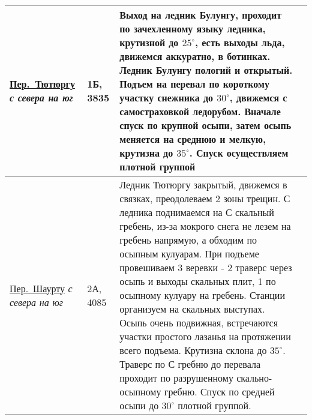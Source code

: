 \begin{longtable}{|>{\centering\arraybackslash}m{4.5cm}|>{\centering\arraybackslash}m{1.8cm}|>{\raggedright\arraybackslash}m{9.6cm}|>{\centering\arraybackslash}m{1.2cm}|}
			\hyperref[subsec:main_obstacles]{{\small Пер.~Тютюргу}}																	\newline\textit{с севера на юг}			&	1Б, 3835					&	{\small Выход на ледник Булунгу, проходит по зачехленному языку ледника, крутизной до $25^\circ$, есть выходы льда, движемся аккуратно, в ботинках. Ледник Булунгу пологий и открытый. Подъем на перевал по короткому участку снежника до $30^\circ$, движемся с самостраховкой ледорубом. Вначале спуск по крупной осыпи, затем осыпь меняется на среднюю и мелкую, крутизна до $35^\circ$. Спуск осуществляем плотной группой}																																																																																																																																																																																																																																								&			\\ \hline
			\hyperref[subsec:main_obstacles]{{\small Пер.~Шаурту}}																	\newline\textit{с севера на юг}			&	2А,	4085					&	{\small Ледник Тютюргу закрытый, движемся в связках, преодолеваем 2 зоны трещин. С ледника поднимаемся на С скальный гребень, из-за мокрого снега не лезем на гребень напрямую, а обходим по осыпным кулуарам. При подъеме провешиваем 3 веревки - 2 траверс через осыпь и выходы скальных плит, 1 по осыпному кулуару на гребень. Станции организуем на скальных выступах. Осыпь очень подвижная, встречаются участки простого лазанья на протяжении всего подъема. Крутизна склона до $35^\circ$. Траверс по С гребню до перевала проходит по разрушенному скально-осыпному гребню. Спуск по средней осыпи до $30^\circ$ плотной группой.}																																																																																																																																																																																					&			\\ \hline

\end{longtable}
